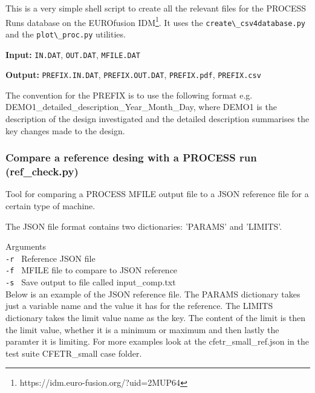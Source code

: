 \documentclass[11pt,a4paper]{article}
\newcommand{\indat}{\mbox{\texttt{IN.DAT}}}
\newcommand{\mfile}{\mbox{\texttt{MFILE.DAT}}}
\newcommand{\outdat}{\mbox{\texttt{OUT.DAT}}}
\begin{document}
This is a very simple shell script to create all the relevant files for the PROCESS Runs database on the EUROfusion IDM\footnote{https://idm.euro-fusion.org/?uid=2MUP64}. It uses the \verb|create\_csv4database.py| and the \verb|plot\_proc.py| utilities.

\begin{description}
\item{\textbf{Input:}}
\indat, \outdat, \mfile

\item{\textbf{Output:}}
\verb|PREFIX.|\indat, \verb|PREFIX.|\outdat, \verb|PREFIX.pdf|, \verb|PREFIX.csv|
\end{description}

The convention for the PREFIX is to use the following format e.g. DEMO1\_detailed\_description\_Year\_Month\_Day, where DEMO1 is the description of the design investigated and the detailed description summarises the key changes made to the design.



\subsubsection{Compare a reference desing with a PROCESS run (ref\_check.py)}
Tool for comparing a PROCESS MFILE output file to a JSON reference file for a
certain type of machine.

The JSON file format contains two dictionaries: 'PARAMS' and 'LIMITS'.

Arguments\\
\texttt{-r        }     Reference JSON file\\
\texttt{-f        }     MFILE file to compare to JSON reference\\
\texttt{-s        }     Save output to file called input\_comp.txt\\

Below is an example of the JSON reference file. The PARAMS dictionary takes
just a variable name and the value it has for the reference. The LIMITS
dictionary takes the limit value name as the key. The content of the limit is
then the limit value, whether it is a minimum or maximum and then lastly the
paramter it is limiting. For more examples look at the cfetr\_small\_ref.json in
the test suite CFETR\_small case folder.
\end{document}
